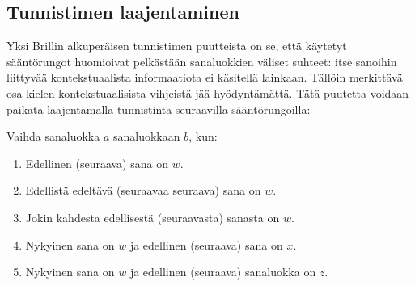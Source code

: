 \documentclass[utf8,bachelor,manualbib]{gradu3}
\begin{document}
\begin{comment}
\begin{table}[H]
\centering
\caption{10 ensimmäistä transformaatiosääntöä Penn Treebank-aineistolla harjoittaessa. Lähde: \citet{brill1995}}
\begin{tabular}{|c|c|c|c|}
\hline
\# & Mistä & Mihin & Ehto \\ \hline
1 & NN & VB & Edellinen sanaluokka on $TO$ \\
2 & VBP & VB & Jokin kolmesta edellisestä sanaluokasta on $MD$ \\
3 & NN & VB & Jokin kahdesta edellisestä sanaluokasta on $MD$ \\
4 & VB & NN & Jokin kahdesta edellisestä sanaluokasta on $DT$ \\
5 & VBD & VBN & Jokin kolmesta edellisestä sanaluokasta on $VBZ$ \\
6 & VBN & VBD & Edellinen sanaluokka on $PRP$ \\
7 & VBN & VBD & Edellinen sanaluokka on $NNP$ \\
8 & VBD & VBN & Edellinen sanaluokka on $VBD$ \\
9 & VBP & VB & Edellinen sanaluokka on $TO$ \\
10 & POS & VBZ & Edellinen sanaluokka on $PRP$ \\ \hline
\end{tabular}
\end{table}
\end{comment}

\subsection{Tunnistimen laajentaminen}

Yksi Brillin alkuperäisen tunnistimen puutteista on se, että käytetyt sääntörungot huomioivat pelkästään sanaluokkien väliset suhteet: itse sanoihin liittyvää kontekstuaalista informaatiota ei käsitellä lainkaan. Tällöin merkittävä osa kielen kontekstuaalisista vihjeistä jää hyödyntämättä. Tätä puutetta voidaan paikata laajentamalla tunnistinta seuraavilla sääntörungoilla:

Vaihda sanaluokka $a$ sanaluokkaan $b$, kun:

\begin{enumerate}
\item Edellinen (seuraava) sana on $w$.
\item Edellistä edeltävä (seuraavaa seuraava) sana on $w$. 
\item Jokin kahdesta edellisestä (seuraavasta) sanasta on $w$.
\item Nykyinen sana on $w$ ja edellinen (seuraava) sana on $x$.
\item Nykyinen sana on $w$ ja edellinen (seuraava) sanaluokka on $z$.
\end{enumerate}
\end{document}
